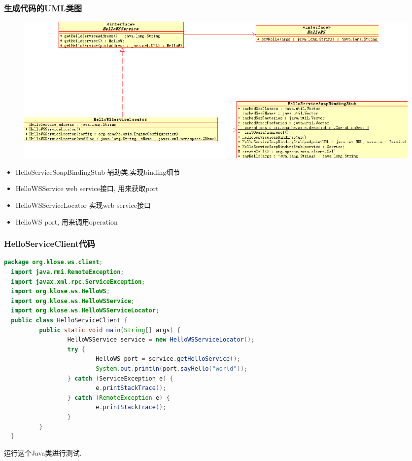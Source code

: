 \documentclass[CJKutf8,compress,hyperref]{beamer}
\begin{document}
\begin{CJK}{UTF8}{song}
  \begin{frame} 
          \frametitle{生成代码的UML类图}
          \begin{figure}[!hbp]
                  \includegraphics{class_diagram.eps}
          \end{figure}
          \begin{itemize} 
                  \item {\color{red}HelloServiceSoapBindingStub} 辅助类,实现binding细节
                  \item {\color{red}HelloWSService} web service接口, 用来获取port
                  \item {\color{red}HelloWSServiceLocator} 实现web service接口
                  \item {\color{red}HelloWS} port, 用来调用operation
          \end{itemize}
  \end{frame}

  \begin{frame}[containsverbatim]
  \frametitle{HelloServiceClient代码 }
  \begin{lstlisting}[language=JAVA]
  package org.klose.ws.client;
  import java.rmi.RemoteException;
  import javax.xml.rpc.ServiceException;
  import org.klose.ws.HelloWS;
  import org.klose.ws.HelloWSService;
  import org.klose.ws.HelloWSServiceLocator;
  public class HelloServiceClient {
          public static void main(String[] args) {
                  HelloWSService service = new HelloWSServiceLocator();
                  try {
                          HelloWS port = service.getHelloService();
                          System.out.println(port.sayHello("world"));
                  } catch (ServiceException e) {
                          e.printStackTrace();
                  } catch (RemoteException e) {
                          e.printStackTrace();
                  }
          }
  }
  \end{lstlisting}
  运行这个Java类进行测试. 
  \end{frame} 


\end{CJK}
\end{document}
